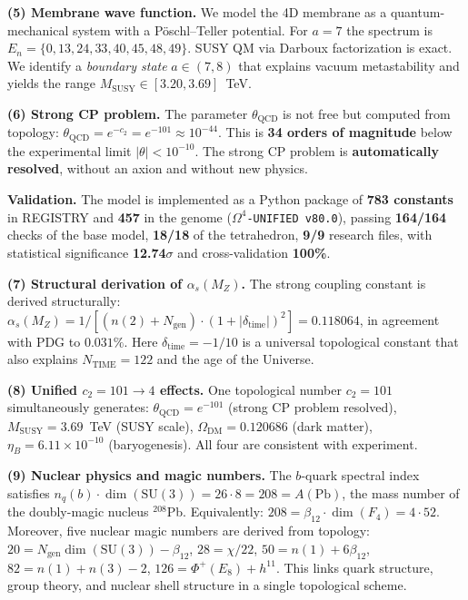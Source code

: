 \documentclass[11pt,a4paper]{article}
\newcommand{\SU}{\ensuremath{\mathrm{SU}}}
\newcommand{\Ngen}{\ensuremath{N_{\text{gen}}}}
\theoremstyle{definition}
\begin{document}
\medskip\noindent
\textbf{(5) Membrane wave function.}
We model the 4D membrane as a quantum-mechanical system
with a P\"oschl--Teller potential. For $a = 7$ the spectrum is
$E_n = \{0, 13, 24, 33, 40, 45, 48, 49\}$. SUSY QM via
Darboux factorization is exact. We identify a
\emph{boundary state} $a \in (7, 8)$ that
explains vacuum metastability and yields the range
$M_{\text{SUSY}} \in [3.20, 3.69]$~TeV.

\medskip\noindent
\textbf{(6) Strong CP problem.}
The parameter $\theta_{\text{QCD}}$ is not free but computed from
topology: $\theta_{\text{QCD}} = e^{-c_2} = e^{-101} \approx 10^{-44}$.
This is \textbf{34 orders of magnitude} below the experimental limit
$|\theta| < 10^{-10}$. The strong CP problem is \textbf{automatically resolved},
without an axion and without new physics.

\medskip\noindent
\textbf{Validation.}
The model is implemented as a Python package of \textbf{783 constants}
in REGISTRY and \textbf{457} in the genome
(\texttt{$\Omega^4$-UNIFIED v80.0}), passing \textbf{164/164}
checks of the base model, \textbf{18/18} of the tetrahedron, \textbf{9/9}
research files, with statistical significance \textbf{12.74$\sigma$}
and cross-validation \textbf{100\%}.

\medskip\noindent
\textbf{(7) Structural derivation of $\alpha_s(M_Z)$.}
The strong coupling constant is derived structurally:
$\alpha_s(M_Z) = 1/[(n(2)+N_{\text{gen}})
\cdot (1+|\delta_{\text{time}}|)^2] = 0.118064$,
in agreement with PDG to $0.031\%$.
Here $\delta_{\text{time}} = -1/10$ is a universal
topological constant that also explains
$N_{\text{TIME}} = 122$ and the age of the Universe.

\medskip\noindent
\textbf{(8) Unified $c_2 = 101 \to 4$ effects.}
One topological number $c_2 = 101$ simultaneously generates:
$\theta_{\text{QCD}} = e^{-101}$ (strong CP problem resolved),
$M_{\text{SUSY}} = 3.69$~TeV (SUSY scale),
$\Omega_{\text{DM}} = 0.120686$ (dark matter),
$\eta_B = 6.11 \times 10^{-10}$ (baryogenesis).
All four are consistent with experiment.

\medskip\noindent
\textbf{(9) Nuclear physics and magic numbers.}
The $b$-quark spectral index satisfies
$n_q(b) \cdot \dim(\SU(3)) = 26 \cdot 8 = 208 = A(\text{Pb})$,
the mass number of the doubly-magic nucleus $^{208}$Pb.
Equivalently: $208 = \beta_{12} \cdot \dim(F_4) = 4 \cdot 52$.
Moreover, five nuclear magic numbers are derived from topology:
$20 = \Ngen \dim(\SU(3)) - \beta_{12}$,
$28 = \chi/22$,
$50 = n(1) + 6\beta_{12}$,
$82 = n(1) + n(3) - 2$,
$126 = \Phi^+(E_8) + h^{11}$.
This links quark structure, group theory, and nuclear shell
structure in a single topological scheme.
\end{document}
